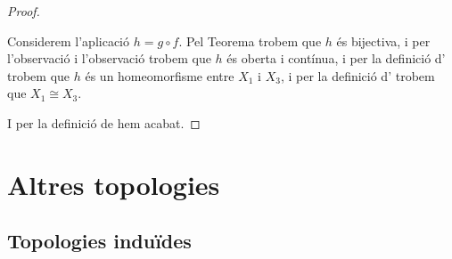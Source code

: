 \documentclass[../../Main.tex]{subfiles}
\begin{document}
\begin{proposition}
\begin{proof}
\begin{enumerate}
				Considerem l'aplicació \(h=g\circ f\). Pel Teorema  trobem que \(h\) és bijectiva, i per l'observació  i l'observació  trobem que \(h\) és oberta i contínua, i per la definició d' trobem que \(h\) és un homeomorfisme entre \(X_{1}\) i \(X_{3}\), i per la definició d' trobem que \(X_{1}\cong X_{3}\).
			\end{enumerate}
			I per la definició de  hem acabat.
		\end{proof}
	\end{proposition}
\chapter{Altres topologies}
\section{Topologies induïdes}
\end{document}
